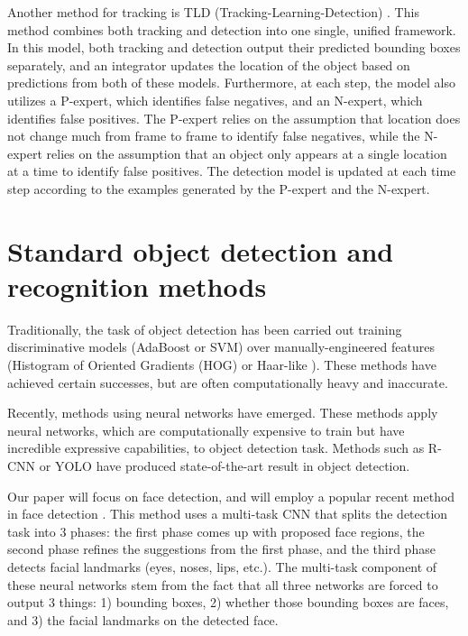 \documentclass{article}
\begin{document}
Another method for tracking is TLD (Tracking-Learning-Detection) \cite{TLD}. This
method combines both tracking and detection into one single, unified framework.
In this model, both tracking and detection output their predicted bounding boxes
separately, and an integrator updates the location of the object based on
predictions from both of these models. Furthermore, at each step, the model
also utilizes a P-expert, which identifies false negatives, and an N-expert,
which identifies false positives. The P-expert relies on the assumption
that location does not change much from frame to frame to identify false negatives,
while the N-expert relies on the assumption that an object only appears at
a single location at a time to identify false positives. The detection model
is updated at each time step according to the examples generated by the P-expert and
the N-expert.

\newpage

\section{Standard object detection and recognition methods}

Traditionally, the task of object detection has been carried out training
discriminative models (AdaBoost or SVM) over manually-engineered features (Histogram of Oriented Gradients (HOG) \cite{hog}
or Haar-like \cite{haar}). These methods have achieved certain successes, but
are often computationally heavy and inaccurate.

Recently, methods using neural networks have emerged. These methods apply neural
networks, which are computationally expensive to train but have incredible
expressive capabilities, to object detection task. Methods such as
R-CNN \cite{rcnn} or YOLO \cite{yolo} have produced state-of-the-art result
in object detection.

Our paper will focus on face detection, and will employ a popular recent
method in face detection \cite{mtcnn}. This method uses a multi-task CNN
that splits the detection task into 3 phases: the first phase comes up with
proposed face regions, the second phase refines the suggestions from the
first phase, and the third phase detects facial landmarks (eyes, noses, lips, etc.).
The multi-task component of these neural networks stem from the fact that
all three networks are forced to output 3 things: 1) bounding boxes, 2) whether
those bounding boxes are faces, and 3) the facial landmarks on the detected
face.
\end{document}
